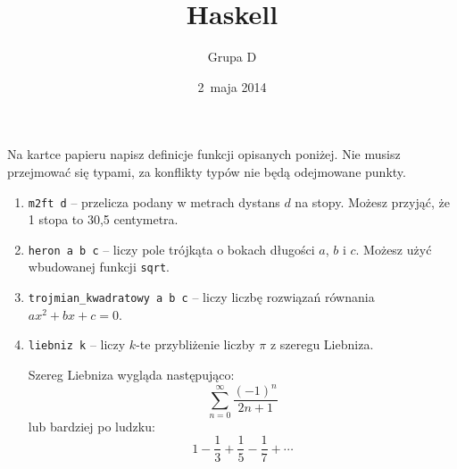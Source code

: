 \documentclass[12pt,a4paper]{article}
\title{Haskell}
\author{Grupa D}
\date{2~maja 2014}
\begin{document}
\maketitle

Na kartce papieru napisz definicje funkcji opisanych poniżej. Nie musisz
przejmować się typami, za konflikty typów nie będą odejmowane punkty.

\begin{enumerate}
  \item {
    \texttt{m2ft d} -- przelicza podany w metrach dystans $d$ na stopy.
    Możesz przyjąć, że 1 stopa to 30,5 centymetra.
  }

  \item {
    \texttt{heron a b c} -- liczy pole trójkąta o bokach długości $a$, $b$ i $c$.
    Możesz użyć wbudowanej funkcji \texttt{sqrt}.
  }

  \item {
    \texttt{trojmian\_kwadratowy a b c} -- liczy liczbę rozwiązań równania 
    $ax^2 + bx + c = 0$.
  }

  \item {
    \texttt{liebniz k} -- liczy $k$-te przybliżenie liczby $\pi$ z szeregu 
    Liebniza. 
    
    Szereg Liebniza wygląda następująco:
    $$\sum_{n=0}^{\infty} \frac{(-1)^n}{2n+1}$$ lub bardziej po ludzku:
    $$1-\frac13 + \frac15 - \frac17 + \cdots$$
  }
\end{enumerate}
\end{document}
